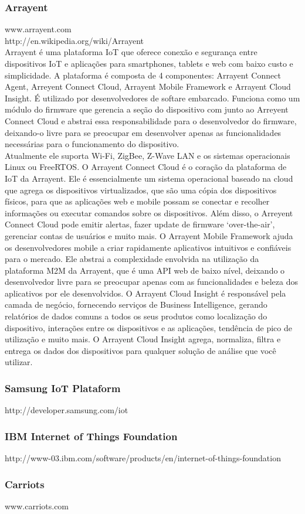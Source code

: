 \subsubsection{Arrayent}
www.arrayent.com\\
http://en.wikipedia.org/wiki/Arrayent\\
Arrayent é uma plataforma IoT que oferece conexão e segurança entre dispositivos IoT e aplicações para  smartphones, tablets e web com baixo custo e simplicidade. A plataforma é composta de 4 componentes: Arrayent Connect Agent, Arreyent Connect Cloud, Arrayent Mobile Framework e Arrayent Cloud Insight.
É utilizado por desenvolvedores de softare embarcado. Funciona como um módulo do firmware que gerencia a seção do dispositivo com junto ao Arreyent Connect Cloud e abstrai essa responsabilidade para o desenvolvedor do firmware, deixando-o livre para se preocupar em desenvolver apenas as funcionalidades necessárias para o funcionamento do dispositivo.\\
Atualmente ele suporta Wi-Fi, ZigBee, Z-Wave LAN e os sistemas operacionais Linux ou FreeRTOS.
O Arrayent Connect Cloud é o coração da plataforma de IoT da Arrayent. Ele é essencialmente um sistema operacional baseado na cloud que agrega os dispositivos virtualizados, que são uma cópia dos dispositivos físicos,  para que as aplicações web e mobile possam se conectar e recolher informações ou executar comandos sobre os dispositivos. Além disso, o Arreyent Connect Cloud pode emitir alertas, fazer update de firmware \lq over-the-air\rq, gerenciar contas de usuários e muito mais.
O Arrayent Mobile Framework ajuda os desenvolvedores mobile a criar rapidamente aplicativos intuitivos e confiáveis para o mercado. Ele abstrai a complexidade envolvida na utilização da plataforma M2M da Arrayent, que é uma API web de baixo nível, deixando o desenvolvedor livre para se preocupar apenas com as funcionalidades e beleza dos aplicativos por ele desenvolvidos.
O Arrayent Cloud Insight é responsável pela camada de negócio, fornecendo serviços de Business Intelligence, gerando relatórios de dados comuns a todos os seus produtos como localização do dispositivo, interações entre os dispositivos e as aplicações, tendência de pico de utilização e muito mais. O Arrayent Cloud Insight agrega, normaliza, filtra e entrega os dados dos dispositivos para qualquer solução de análise que você utilizar.

\subsubsection{Samsung IoT Plataform}
http://developer.samsung.com/iot \\

\subsubsection{IBM Internet of Things Foundation}
http://www-03.ibm.com/software/products/en/internet-of-things-foundation \\

\subsubsection{Carriots}
www.carriots.com\\
